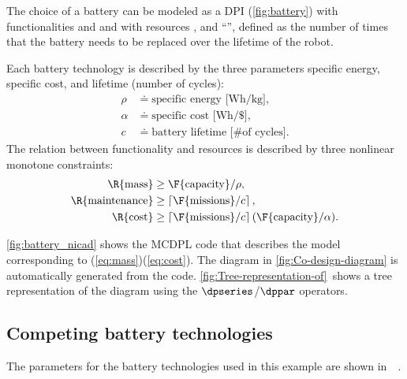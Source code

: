 The choice of a battery can be modeled as a DPI (\cref{fig:battery})
with functionalities  and 
and with resources ,  and ``'',
defined as the number of times that the battery needs to be replaced
over the lifetime of the robot.

Each battery technology is described by the three parameters specific
energy, specific cost, and lifetime (number of cycles):
\begin{align*}
\rho & \doteq\text{specific energy [Wh/kg]},\\
\alpha & \doteq\text{specific cost [Wh/\$]},\\
c & \doteq\text{battery lifetime [\# of cycles]}.
\end{align*}
The relation between functionality and resources is described by three
nonlinear monotone constraints:
\begin{align}
\R{\text{mass}} & \geq\F{\text{capacity}}/\rho,\label{eq:mass}\\
\R{\text{maintenance}} & \geq\left\lceil \F{\text{missions}}/c\right\rceil ,\label{eq:maintenance}\\
\R{\text{cost}} & \geq\left\lceil \F{\text{missions}}/c\right\rceil (\F{\text{capacity}}/\alpha).\label{eq:cost}
\end{align}

\cref{fig:battery_nicad} shows the MCDPL code that describes the
model corresponding to (\ref{eq:mass})\textendash (\ref{eq:cost}).
The diagram in \cref{fig:Co-design-diagram} is automatically generated
from the code. \cref{fig:Tree-representation-of}~shows a tree representation
of the diagram using the $\dpseries$/$\dppar$ operators.

\subsection{Competing battery technologies}

The parameters for the battery technologies used in this example are
shown in~~.

